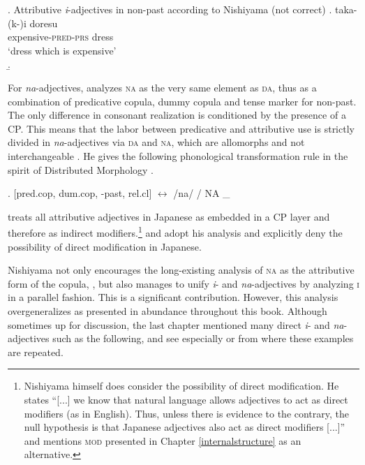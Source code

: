 \documentclass [output=book,colorlinks,citecolor=brown]{langscibook}
\begin{document}
\ex. Attributive \textit{i}-adjectives in non-past according to Nishiyama (not correct)
\ag. taka-(k-)i doresu\\
expensive-\textsc{pred-prs} dress\\
`dress which is expensive'\\
\b. 

For \textit{na}-adjectives, \citet[196–199]{nishiyama:1999:adj} analyzes \textsc{na} as the very same element as \textsc{da}, thus as a combination of predicative copula, dummy copula and tense marker for non-past. The only difference in consonant realization is conditioned by the presence of a CP. This means that the labor between predicative and attributive use is strictly divided in \textit{na}-adjectives via \textsc{da} and \textsc{na}, which are allomorphs and not interchangeable \citep[197]{nishiyama:1999:adj}. He gives the following phonological transformation rule in the spirit of Distributed Morphology \citep{halle:1993:distributed, halle:1994:some}.

\ex. [pred.cop, dum.cop, -past, rel.cl] $\leftrightarrow$ /na/ / NA \_ \\ \null \hfill \citep[197]{nishiyama:1999:adj}

\citet{nishiyama:1999:adj} treats all attributive adjectives in Japanese as embedded in a CP layer and therefore as indirect modifiers.\footnote{Nishiyama himself does consider the possibility of direct modification. He states ``[...] we know that natural language allows adjectives to act as direct modifiers (as in English). Thus, unless there is evidence to the contrary, the null hypothesis is that Japanese adjectives also act as direct modifiers [...]” \citep[201]{nishiyama:1999:adj} and mentions \textsc{mod} presented in Chapter \ref{internalstructure} as an alternative.} \citet{baker:2003:verbal} and \citet{hoshi:2002:kaynean} adopt his analysis and explicitly deny the possibility of direct modification in Japanese.

Nishiyama not only encourages the long-existing analysis of \textsc{na} as the attributive form of the copula, \citep{teramura:1982:nihongo, miyagawa:1987:lexical, murasugi:1991:noun, kubo:1992:japanese, urushibara:1993:syntactic}, but also manages to unify \textit{i}- and \textit{na}-adjectives by analyzing \textsc{i} in a parallel fashion. This is a significant contribution. However, this analysis overgeneralizes as presented in abundance throughout this book. Although sometimes up for discussion, the last chapter mentioned many direct \textit{i}- and \textit{na}-adjectives such as the following, and see especially \citet{yamakido:2005:nature} or \citet{ayano:2010:revisiting} from where these examples are repeated. %
\end{document}
